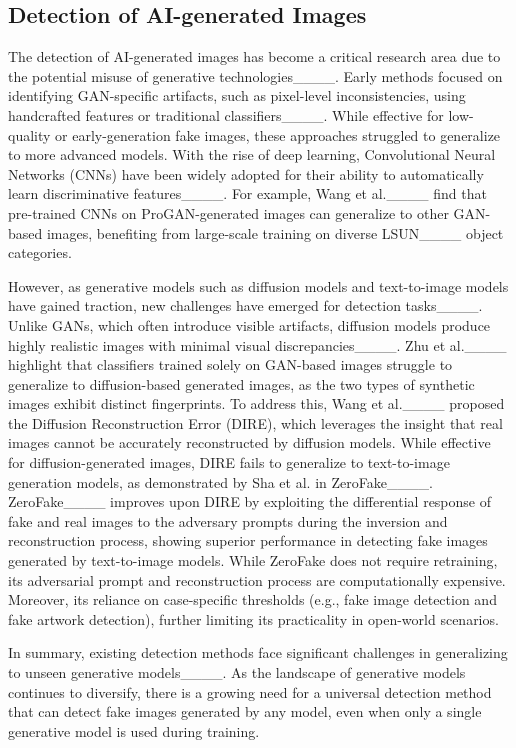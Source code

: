 \subsection{Detection of AI-generated Images}
The detection of AI-generated images has become a critical research area due to the potential misuse of generative technologies____. 
Early methods focused on identifying GAN-specific artifacts, such as pixel-level inconsistencies, using handcrafted features or traditional classifiers____. While effective for low-quality or early-generation fake images, these approaches struggled to generalize to more advanced models. With the rise of deep learning, Convolutional Neural Networks (CNNs) have been widely adopted for their ability to automatically learn discriminative features____. For example, Wang et al.____ find that pre-trained CNNs on ProGAN-generated images can generalize to other GAN-based images, benefiting from large-scale training on diverse LSUN____ object categories.

However, as generative models such as diffusion models and text-to-image models have gained traction, new challenges have emerged for detection tasks____. Unlike GANs, which often introduce visible artifacts, diffusion models produce highly realistic images with minimal visual discrepancies____. Zhu et al.____ highlight that classifiers trained solely on GAN-based images struggle to generalize to diffusion-based generated images, as the two types of synthetic images exhibit distinct fingerprints.
To address this, Wang et al.____ proposed the Diffusion Reconstruction Error (DIRE), which leverages the insight that real images cannot be accurately reconstructed by diffusion models. While effective for diffusion-generated images, DIRE fails to generalize to text-to-image generation models, as demonstrated by Sha et al. in ZeroFake____. ZeroFake____ improves upon DIRE by exploiting the differential response of fake and real images to the adversary prompts during the inversion and reconstruction process, showing superior performance in detecting fake images generated by text-to-image models. While ZeroFake does not require retraining, its adversarial prompt and reconstruction process are computationally expensive. Moreover, its reliance on case-specific thresholds (e.g., fake image detection and fake artwork detection), further limiting its practicality in open-world scenarios.

In summary, existing detection methods face significant challenges in generalizing to unseen generative models____. As the landscape of generative models continues to diversify, there is a growing need for a universal detection method that can detect fake images generated by any model, even when only a single generative model is used during training. 

